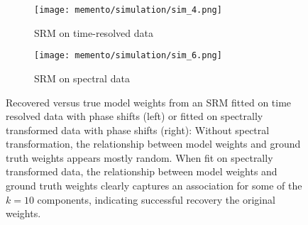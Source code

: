 \begin{figure}
	\begin{subfigure}{0.49\textwidth}
		\texttt{[image: memento/simulation/sim\_4.png]}
		\caption{SRM on time-resolved data}
		\label{fig:sim-timeresolved-weights}
	\end{subfigure}
	\begin{subfigure}{0.49\textwidth}
	\texttt{[image: memento/simulation/sim\_6.png]}
	\caption{SRM on spectral data}
	\label{fig:sim-spectral-weights}
	\end{subfigure}
	\caption[Relationship of model weights and true weights]{Recovered versus true model weights from an \gls{SRM} fitted on time resolved data with phase shifts (left) or fitted on spectrally transformed data with phase shifts (right): Without spectral transformation, the relationship between model weights and ground truth weights appears mostly random. When fit on spectrally transformed data, the relationship between model weights and ground truth weights clearly captures an association for some of the $k=10$ components, indicating successful recovery the original weights.}
	\label{fig:sim-weights}
\end{figure}


